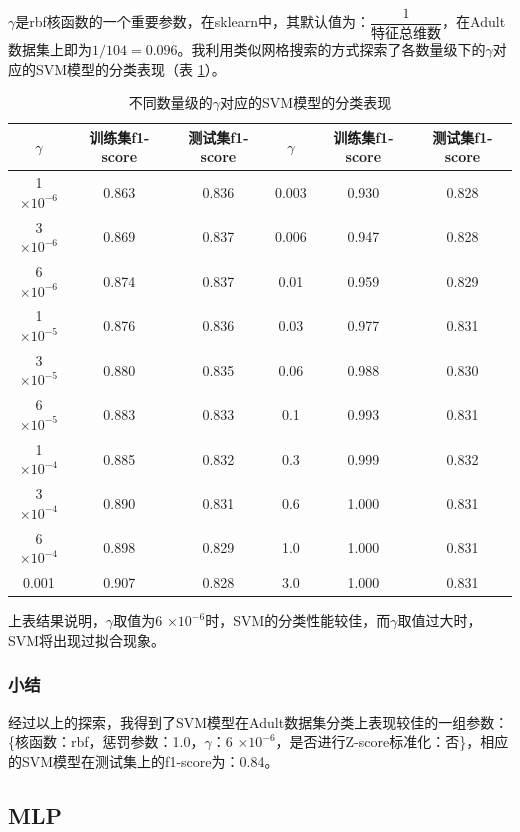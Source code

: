 \documentclass[12pt,a4paper]{article}
\theoremstyle{definition}
\begin{document}
$\gamma$是rbf核函数的一个重要参数，在sklearn中，其默认值为：$\dfrac{1}{\mbox{特征总维数}}$，在Adult数据集上即为$1/104=0.096$。我利用类似网格搜索的方式探索了各数量级下的$\gamma$对应的SVM模型的分类表现（表 \ref{tab:gammma}）。

\begin{table}[H]
	\renewcommand\arraystretch{1.25}
	\caption{不同数量级的$\gamma$对应的SVM模型的分类表现}
	\label{tab:gammma}
	\centering
	
	\begin{tabular}{c|c|c||c|c|c}
		\centering
		$\gamma$ & 训练集f1-score & 测试集f1-score & $\gamma$ & 训练集f1-score & 测试集f1-score \\
		\hline
		\hline
		
		1 $\times 10^{-6}$  & 0.863 & 0.836 & 0.003 & 0.930 & 0.828 \\
		3 $\times 10^{-6}$ & 0.869 & 0.837 & 0.006 & 0.947 & 0.828 \\
		6 $\times 10^{-6}$ & 0.874 & 0.837 & 0.01 & 0.959 & 0.829 \\
		1 $\times 10^{-5}$  & 0.876 & 0.836 & 0.03 & 0.977 & 0.831 \\
		3 $\times 10^{-5}$ & 0.880 & 0.835 & 0.06 & 0.988 & 0.830 \\
		6 $\times 10^{-5}$ & 0.883 & 0.833 & 0.1 & 0.993 & 0.831 \\
		1 $\times 10^{-4}$ & 0.885 & 0.832 & 0.3 & 0.999 & 0.832 \\
		3 $\times 10^{-4}$ & 0.890 & 0.831 & 0.6 & 1.000 & 0.831 \\
		6 $\times 10^{-4}$ & 0.898 & 0.829 & 1.0 & 1.000 & 0.831 \\
		0.001 & 0.907 & 0.828 & 3.0 & 1.000 & 0.831 \\

	\end{tabular}
\end{table}

上表结果说明，$\gamma$取值为6 $\times 10^{-6}$时，SVM的分类性能较佳，而$\gamma$取值过大时，SVM将出现过拟合现象。

\subsubsection{小结}

经过以上的探索，我得到了SVM模型在Adult数据集分类上表现较佳的一组参数：\{核函数：rbf，惩罚参数：1.0，$\gamma$：6 $\times 10^{-6}$，是否进行Z-score标准化：否\}，相应的SVM模型在测试集上的f1-score为：0.84。

\subsection{MLP}
\end{document}

